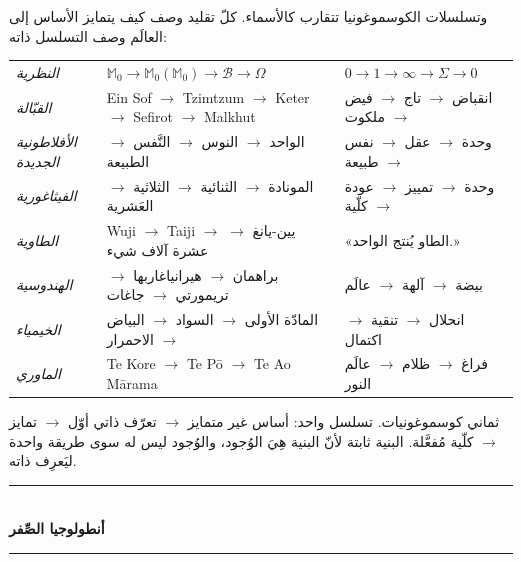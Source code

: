 \documentclass[10pt, openany, oneside]{book}
\renewcommand{\normalsize}{\fontsize{10}{13}\selectfont}
\renewcommand{\footnotesize}{\fontsize{8.5}{11}\selectfont}
\begin{document}
وتسلسلات الكوسموغونيا تتقارب كالأسماء. كلّ تقليد وصف كيف يتمايز الأساس إلى العالَم وصف التسلسل ذاته:

\vspace{0.5em}

{\footnotesize
\noindent\begin{tabular}{l p{} p{}}
\textit{النظرية} & $\mathbb{M}_0 \to \mathbb{M}_0(\mathbb{M}_0) \to \mathcal{B} \to \Omega$ & $0 \to 1 \to \infty \to \Sigma \to 0$ \\[0.3em]
\textit{القبّالة} & Ein Sof $\to$ Tzimtzum $\to$ Keter $\to$ Sefirot $\to$ Malkhut & انقباض $\to$ تاج $\to$ فيض $\to$ ملكوت \\[0.3em]
\textit{الأفلاطونية الجديدة} & الواحد $\to$ النوس $\to$ النَّفس $\to$ الطبيعة & وحدة $\to$ عقل $\to$ نفس $\to$ طبيعة \\[0.3em]
\textit{الفيثاغورية} & المونادة $\to$ الثنائية $\to$ الثلاثية $\to$ العَشرية & وحدة $\to$ تمييز $\to$ عودة $\to$ كلّية \\[0.3em]
\textit{الطاوية} & Wuji $\to$ Taiji $\to$ يين-يانغ $\to$ عشرة آلاف شيء & «الطاو يُنتج الواحد.» \\[0.3em]
\textit{الهندوسية} & براهمان $\to$ هيرانياغاربها $\to$ تريمورتي $\to$ جاغات & بيضة $\to$ آلهة $\to$ عالَم \\[0.3em]
\textit{الخيمياء} & المادّة الأولى $\to$ السواد $\to$ البياض $\to$ الاحمرار & انحلال $\to$ تنقية $\to$ اكتمال \\[0.3em]
\textit{الماوري} & Te Kore $\to$ Te P\={o} $\to$ Te Ao M\={a}rama & فراغ $\to$ ظلام $\to$ عالَم النور \\[0.3em]
\end{tabular}
}

\vspace{0.5em}

\noindent ثماني كوسموغونيات. تسلسل واحد: أساس غير متمايز $\to$ تعرّف ذاتي أوّل $\to$ تمايز $\to$ كلّية مُفعَّلة. البنية ثابتة لأنّ البنية هِيَ الوُجود، والوُجود ليس له سوى طريقة واحدة ليَعرِف ذاته.

\vspace{1em}

\begin{center}
    \rule{0.3\textwidth}{0.4pt}\\[0.5em]
    {\normalsize\bfseries أنطولوجيا الصِّفر}\\[0.3em]
    \rule{0.3\textwidth}{0.4pt}
\end{center}

\vspace{0.8em}
\end{document}
